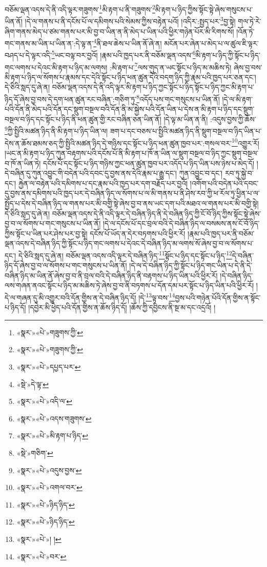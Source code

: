 བཅོམ་ལྡན་འདས་དེ་ནི་འདི་ལྟར་གཟུགས་\footnote{«སྣར་»«པེ་»གཟུགས་ཀྱི་}མི་རྟག་པ་ནི་གཟུགས་\footnote{«སྣར་»«པེ་»གཟུགས་ཀྱི་}མི་རྟག་པ་ཉིད་ཀྱིས་སྟོང་སྟེ་ཞེས་གསུངས་པ་ཡིན་ནོ། །དེ་ལ་གནས་པ་ནི་དངོས་པོ་ལ་དམིགས་པའི་སེམས་ཀྱིས་བརྟེན་པའོ། །འདིར་:སྤྱད་པར་\footnote{«སྣར་»«པེ་»དཔྱད་པར་}བྱ་སྟེ། གལ་ཏེ་རེ་ཞིག་གནས་མེད་པ་ཙམ་གནས་པར་མི་བྱ་བ་ཡིན་ན་ནི་མེད་པ་ཡིན་པའི་ཕྱིར་གཉེན་པོར་མི་རིགས་སོ། །འོན་ཏེ་གང་གནས་མ་ཡིན་པ་ཡིན་ན་:དེ་ལྟ་ན་\footnote{«སྡེ་»དེ་ལྟ་}ནི་ཐལ་ཆེས་པ་ཡིན་ནོ་ཞེ་ན། མངོན་པར་ཞེན་པ་མེད་པ་ལ་ཚུལ་ཇི་ལྟར་བཤད་པ་དེ་ལྟར་འདི་\footnote{«སྣར་»«པེ་»འདི་ལ་}ཡང་བལྟ་བར་བྱའོ། །རྣམ་པའི་ཁྱད་པར་ནི་བཅོམ་ལྡན་འདས་\footnote{«སྣར་»«པེ་»འདས་གཟུགས་}མི་རྟག་པ་ཉིད་ཀྱི་སྟོང་པ་ཉིད་གང་ལགས་པ་དེའང་མི་རྟག་པ་ཉིད་མ་ལགས། :མི་རྟག་པ་\footnote{«སྣར་»«པེ་»མི་རྟག་པ་ཉིད་}ལས་གུད་ན་ཡང་སྟོང་པ་ཉིད་མ་མཆིས་ཏེ། ཞེས་བྱ་བས་མི་རྟག་པ་ཉིད་ལ་སོགས་པ་རྣམས་དང་དེའི་སྟོང་པ་ཉིད་ཕན་ཚུན་དེའི་བདག་ཉིད་ཀྱི་རྣམ་པའི་ཁྱད་པར་ཅན་དང་། དེ་ཅིའི་སླད་དུ་ཞེ་ན། བཅོམ་ལྡན་འདས་དེ་ནི་འདི་ལྟར་མི་རྟག་པ་ཉིད་ཀྱང་སྟོང་པ་ཉིད་སྟོང་པ་ཉིད་ཀྱང་མི་རྟག་པ་ཉིད་དོ་ཞེས་བྱ་བས་དེ་དག་ཕན་ཚུན་རང་བཞིན་:གཅིག་ཏུ་\footnote{«སྡེ་»གཅིག་}འདོད་པས་གང་གསུངས་པ་ཡིན་ནོ། །དེ་ལ་མི་རྟག་པའི་དོན་ནི་མེད་པའི་དོན་དང་སྡུག་བསྔལ་བའི་དོན་ནི་མ་སྐྱེས་པའི་དོན་ཡིན་པ་དེས་ན་མི་རྟག་པ་ཉིད་དང་སྡུག་བསྔལ་བ་ཉིད་དང་སྟོང་པ་ཉིད་ནི་ཕན་ཚུན་གྱི་རང་བཞིན་ཅན་ཡིན་ནོ། །དེ་ལྟ་མ་ཡིན་ན་ནི། :འདུས་བྱས་ཀྱི་ཆོས་\footnote{«སྣར་»«པེ་»འདུས་བྱས་}ཀྱི་སྤྱིའི་མཚན་ཉིད་ནི་མི་རྟག་པ་ཉིད་ཡིན་ལ། ཟག་པ་དང་བཅས་པ་སྤྱིའི་མཚན་ཉིད་ནི་སྡུག་བསྔལ་བ་ཉིད་ཡིན་པ་དེས་ན་ཆོས་ཐམས་ཅད་ཀྱི་སྤྱིའི་མཚན་ཉིད་དེ་གཉིས་དང་སྟོང་པ་ཉིད་ཕན་ཚུན་ཁྱབ་པར་:གསལ་བར་\footnote{«སྣར་»«པེ་»འགལ་བར་}འགྱུར་རོ། །ཡང་ན་མི་རྟག་པ་ཉིད་ཀུན་བརྟགས་པའི་དངོས་པོ་ནི་མི་རྟག་པ་ཁོ་ན་ཡིན་ལ་སྡུག་བསྔལ་བ་ཉིད་ཀྱང་སྡུག་བསྔལ་བ་ཁོ་ན་ཡིན་ཏེ། དངོས་པོ་དང་སྟོང་པ་ཉིད་གཉིས་ཀྱང་ཕན་ཚུན་ཁྱབ་པར་འདོད་པ་ཉིད་ཡིན་པས་ཉེས་པ་མེད་དོ། །དེ་བཞིན་དུ་ཀུན་འབྱུང་གི་བདེན་པའི་དབང་དུ་བྱས་ནས་དེའི་རྣམ་པ་རྒྱུ་དང་། ཀུན་འབྱུང་བ་དང་། རབ་ཏུ་སྐྱེ་བ་དང་། རྐྱེན་ལ་བརྟེན་པའི་དམིགས་པ་དང་རྣམ་པའི་ཁྱད་པར་དག་བརྗོད་པར་བྱའོ། །འགོག་པའི་བདེན་པའི་དབང་དུ་བྱས་ནས་དམིགས་པའི་ཁྱད་པར་དེ་བཞིན་ཉིད་ལ་སོགས་པ་ལ་མི་གནས་པ་ནི་ཤེས་རབ་ཀྱི་ཕ་རོལ་ཏུ་ཕྱིན་པ་ལ་སྤྱོད་པ་དེས་དེ་བཞིན་ཉིད་ལ་གནས་པར་མི་བགྱི་སྟེ་ཞེས་བྱ་བ་ནས་ཡང་དག་པའི་མཐའ་ལ་གནས་པར་མི་བགྱི་སྟེ། དེ་ཅིའི་སླད་དུ་ཞེ་ན། བཅོམ་ལྡན་འདས་དེ་ནི་འདི་ལྟར་དེ་བཞིན་ཉིད་ནི་དེ་བཞིན་ཉིད་ཀྱི་ངོ་བོ་ཉིད་ཀྱིས་སྟོང་སྟེ་ཞེས་བྱ་བ་ལ་སོགས་པ་གང་གསུངས་པ་ཡིན་ནོ། །དེ་ལ་དངོས་པོ་དང་བྲལ་བའི་དེ་བཞིན་ཉིད་ལ་བསམས་ནས་ངོ་བོ་ཉིད་ཀྱིས་སྟོང་པ་ཡིན་པར་ཤེས་པར་བྱ་སྟེ། དངོས་པོ་ཡོད་ན་དེར་བཏགས་པའི་ཕྱིར་རོ། །རྣམ་པའི་ཁྱད་པར་ནི་བཅོམ་ལྡན་འདས་དེ་བཞིན་ཉིད་ཀྱི་སྟོང་པ་ཉིད་གང་ལགས་པ་དེའང་དེ་བཞིན་ཉིད་མ་ལགས་སོ་ཞེས་བྱ་བ་ལ་སོགས་པ་དང་། དེ་ཅིའི་སླད་དུ་ཞེ་ན། བཅོམ་ལྡན་འདས་འདི་ལྟར་དེ་བཞིན་ཉིད་\footnote{«སྣར་»«པེ་»ཉིད་ཉིད་}སྟོང་པ་ཉིད་དང་སྟོང་པ་ཉིད་\footnote{«སྣར་»«པེ་»ཉིད་ཉིད་}དེ་བཞིན་ཉིད་དོ་ཞེས་བྱ་བ་ལ་སོགས་པ་གང་གསུངས་པ་ཡིན་ནོ། །དེ་ལ་དེ་བཞིན་ཉིད་ཀྱི་སྟོང་པ་ཉིད་གང་ཡིན་པ་དེ་ནི་དེ་བཞིན་ཉིད་མ་ཡིན་ནོ་ཞེས་བྱ་བ་ནི་བྲལ་བའི་དེ་བཞིན་ཉིད་ནི་བརྟགས་པ་ཉིད་ཡིན་པའི་ཕྱིར་རོ། །དེ་བཞིན་ཉིད་ལས་གཞན་ནའང་སྟོང་པ་ཉིད་མ་མཆིས་ཏེ་ཞེས་བྱ་བ་ནི་བཏགས་པ་དོན་དམ་པར་སྟོང་པ་ཉིད་ཡིན་པའི་ཕྱིར་རོ། །དེ་ལ་གཞན་དུ་མི་འགྱུར་བའི་དོན་གྱིས་ན་དེ་བཞིན་ཉིད་དོ། །དེ་\footnote{«སྣར་»«པེ་»། །}ལྟ་བས་\footnote{«སྣར་»«པེ་»བར་}བྱས་པའི་གཉེན་པོའི་དོན་གྱིས་ན་སྟོང་པ་ཉིད་དོ། །དབྱེར་མི་ཕྱེད་པའི་དོན་གྱིས་ན་ཆོས་ཉིད་དོ། །ཆོས་ཀྱི་དབྱིངས་ནི་སྔ་མ་དང་འདྲའོ། །
